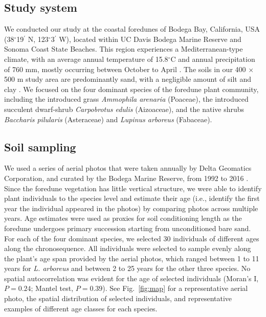 \subsection*{Study system}
We conducted our study at the coastal foredunes of Bodega Bay, California, USA (38$^{\circ}$19$^\prime$ N, 123$^{\circ}$3$^\prime$ W), located within UC Davis Bodega Marine Reserve and Sonoma Coast State Beaches. This region experiences a Mediterranean-type climate, with an average annual temperature of 15.8$^{\circ}$C and annual precipitation of 760 mm, mostly occurring between October to April \citep{Barbour1973, Conser2009}. The soils in our 400 $\times$ 500 m study area are predominantly sand, with a negligible amount of silt and clay \citep{Kleinhesselink2014}. 
We focused on the four dominant species of the foredune plant community, including the introduced grass \textit{Ammophila arenaria} (Poaceae), the introduced succulent dwarf-shrub \textit{Carpobrotus edulis} (Aizoaceae), and the native shrubs \textit{Baccharis pilularis} (Asteraceae) and \textit{Lupinus arboreus} (Fabaceae). 
\par



\subsection*{Soil sampling}
We used a series of aerial photos that were taken annually by Delta Geomatics Corporation, and curated by the Bodega Marine Reserve, from 1992 to 2016 \citep{Danin1998}. Since the foredune vegetation has little vertical structure, we were able to identify plant individuals to the species level and estimate their age (i.e., identify the first year the individual appeared in the photos) by comparing photos across multiple years. Age estimates were used as proxies for soil conditioning length as the foredune undergoes primary succession starting from unconditioned bare sand. 
For each of the four dominant species, we selected 30 individuals of different ages along the chronosequence. All individuals were selected to sample evenly along the plant's age span provided by the aerial photos, which ranged between 1 to 11 years for \textit{L. arboreus} and between 2 to 25 years for the other three species.
No spatial autocorrelation was evident for the age of selected individuals (Moran's I, $P = 0.24$; Mantel test, $P = 0.39$). 
See Fig.~\ref{fig:map} for a representative aerial photo, the spatial distribution of selected individuals, and representative examples of different age classes for each species.
\par


